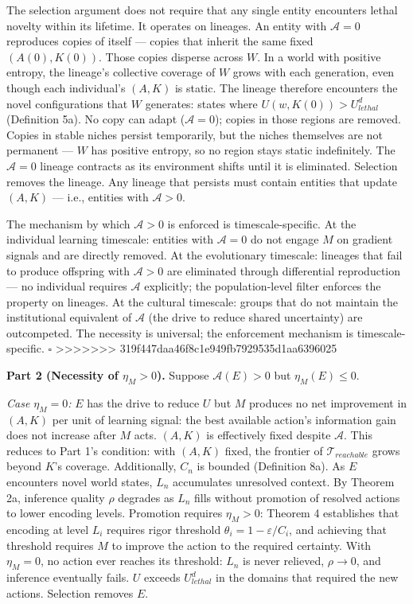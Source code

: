 \documentclass[
]{article}
\begin{document}
The selection argument does not require that any single entity
encounters lethal novelty within its lifetime. It operates on lineages.
An entity with \(\mathcal{A} = 0\) reproduces copies of itself ---
copies that inherit the same fixed \((A(0), K(0))\). Those copies
disperse across \(W\). In a world with positive entropy, the lineage's
collective coverage of \(W\) grows with each generation, even though
each individual's \((A, K)\) is static. The lineage therefore encounters
the novel configurations that \(W\) generates: states where
\(U(w, K(0)) > U_{lethal}^d\) (Definition 5a). No copy can adapt
(\(\mathcal{A} = 0\)); copies in those regions are removed. Copies in
stable niches persist temporarily, but the niches themselves are not
permanent --- \(W\) has positive entropy, so no region stays static
indefinitely. The \(\mathcal{A} = 0\) lineage contracts as its
environment shifts until it is eliminated. Selection removes the lineage.
Any lineage that persists must contain entities that update \((A, K)\)
--- i.e., entities with \(\mathcal{A} > 0\).

The mechanism by which \(\mathcal{A} > 0\) is enforced is
timescale-specific. At the individual learning timescale: entities with
\(\mathcal{A} = 0\) do not engage \(M\) on gradient signals and are
directly removed. At the evolutionary timescale: lineages that fail to
produce offspring with \(\mathcal{A} > 0\) are eliminated through
differential reproduction --- no individual requires \(\mathcal{A}\)
explicitly; the population-level filter enforces the property on
lineages. At the cultural timescale: groups that do not maintain the
institutional equivalent of \(\mathcal{A}\) (the drive to reduce shared
uncertainty) are outcompeted. The necessity is universal; the
enforcement mechanism is timescale-specific. \(\square\)
>>>>>>> 319f447daa46f8c1e949fb7929535d1aa6396025

\textbf{Part 2 (Necessity of \(\eta_M > 0\)).} Suppose
\(\mathcal{A}(E) > 0\) but \(\eta_M(E) \leq 0\).

\emph{Case \(\eta_M = 0\):} \(E\) has the drive to reduce \(U\) but
\(M\) produces no net improvement in \((A, K)\) per unit of learning
signal: the best available action's information gain does not increase
after \(M\) acts. \((A, K)\) is effectively fixed despite
\(\mathcal{A}\). This reduces to Part 1's condition: with \((A, K)\)
fixed, the frontier of \(\mathcal{T}_{reachable}\) grows beyond \(K\)'s
coverage. Additionally, \(C_n\) is bounded (Definition 8a). As \(E\)
encounters novel world states, \(L_n\) accumulates unresolved context.
By Theorem 2a, inference quality \(\rho\) degrades as \(L_n\) fills
without promotion of resolved actions to lower encoding levels.
Promotion requires \(\eta_M > 0\): Theorem 4 establishes that encoding
at level \(L_i\) requires rigor threshold
\(\theta_i = 1 - \varepsilon/C_i\), and achieving that threshold
requires \(M\) to improve the action to the required certainty. With
\(\eta_M = 0\), no action ever reaches its threshold: \(L_n\) is never
relieved, \(\rho \to 0\), and inference eventually fails. \(U\) exceeds
\(U_{lethal}^d\) in the domains that required the new actions. Selection
removes \(E\).
\end{document}
